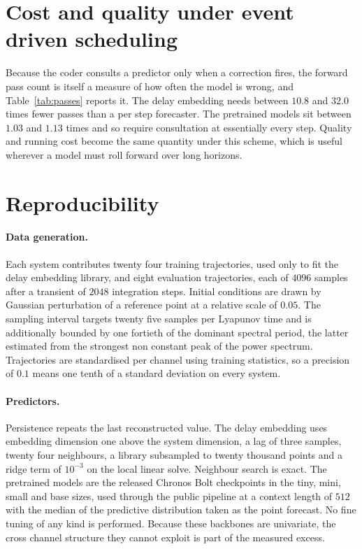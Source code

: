 \documentclass{article}
\begin{document}
\section{Cost and quality under event driven scheduling}

Because the coder consults a predictor only when a correction fires, the forward pass count is itself a measure of how often the model is wrong, and Table~\ref{tab:passes} reports it. The delay embedding needs between $10.8$ and $32.0$ times fewer passes than a per step forecaster. The pretrained models sit between $1.03$ and $1.13$ times and so require consultation at essentially every step. Quality and running cost become the same quantity under this scheme, which is useful wherever a model must roll forward over long horizons.

\section{Reproducibility}

\paragraph{Data generation.}
Each system contributes twenty four training trajectories, used only to fit the delay embedding library, and eight evaluation trajectories, each of $4096$ samples after a transient of $2048$ integration steps. Initial conditions are drawn by Gaussian perturbation of a reference point at a relative scale of $0.05$. The sampling interval targets twenty five samples per Lyapunov time and is additionally bounded by one fortieth of the dominant spectral period, the latter estimated from the strongest non constant peak of the power spectrum. Trajectories are standardised per channel using training statistics, so a precision of $0.1$ means one tenth of a standard deviation on every system.

\paragraph{Predictors.}
Persistence repeats the last reconstructed value. The delay embedding uses embedding dimension one above the system dimension, a lag of three samples, twenty four neighbours, a library subsampled to twenty thousand points and a ridge term of $10^{-3}$ on the local linear solve. Neighbour search is exact. The pretrained models are the released Chronos Bolt checkpoints in the tiny, mini, small and base sizes, used through the public pipeline at a context length of $512$ with the median of the predictive distribution taken as the point forecast. No fine tuning of any kind is performed. Because these backbones are univariate, the cross channel structure they cannot exploit is part of the measured excess.
\end{document}
